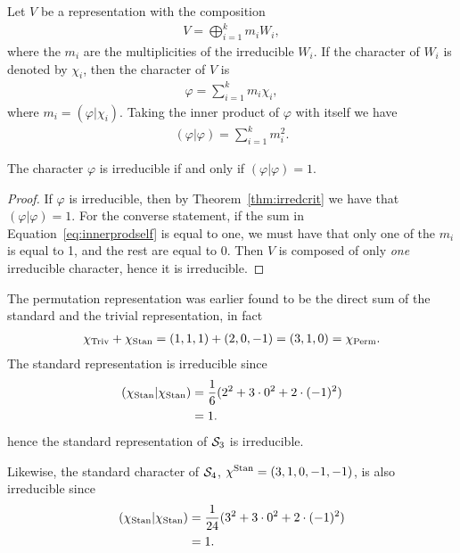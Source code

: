 \begin{note}
	Let $V$ be a representation with the composition 
	\begin{align*}
		V = \bigoplus_{i=1}^k m_i W_i, %
	\end{align*}
	where the $m_i$ are the multiplicities of the irreducible $W_i$. If the character of $W_i$ is denoted by $\chi_i$, then the character of $V$ is
	\begin{align*}
		\varphi = \sum_{i=1}^k m_i \chi_i,
	\end{align*}
	where $m_i = (\varphi|\chi_i)$.	Taking the inner product of $\varphi$ with itself we have
	\begin{align}\label{eq:innerprodself}
		(\varphi|\varphi) = \sum_{i=1}^k m_i^2.
	\end{align}
\end{note}

\begin{theorem}
	The character $\varphi$ is irreducible if and only if $(\varphi|\varphi) = 1$.
\end{theorem}
\begin{proof}
	If $\varphi$ is irreducible, then by Theorem~\ref{thm:irredcrit} we have that $(\varphi|\varphi) = 1$. For the converse statement, if the sum in Equation~\ref{eq:innerprodself} is equal to one, we must have that only one of the $m_i$ is equal to 1, and the rest are equal to 0. Then $V$ is composed of only \textit{one} irreducible character, hence it is irreducible.
\end{proof}

\begin{example}[$\Sym_3$]
	The permutation representation was earlier found to be the direct sum of the standard and the trivial representation, in fact
	\begin{align*}
		\chi_{\text{Triv}} + \chi_{\text{Stan}} = (1,1,1) + (2,0,-1) = (3,1,0) = \chi_{\text{Perm}}.
	\end{align*}
	The standard representation is irreducible since
	\begin{align*}
		(\chi_{\text{Stan}}\vert\chi_{\text{Stan}})  &= \frac{1}{6}(2^2 + 3\cdot 0^2 + 2 \cdot (-1)^2)  \\
		&= 1.
	\end{align*}
	hence the standard representation of $\Sym_3$ is irreducible. 
\end{example}

\begin{example}[$\Sym_4$]
	Likewise, the standard character of $\Sym_4$, $\chi^{\text{Stan}} = (3,1,0,-1,-1)$, is also irreducible since 
	\begin{align*}
		(\chi_{\text{Stan}} \vert \chi_{\text{Stan}}) &= \frac{1}{24}(3^2 + 3\cdot 0^2 + 2 \cdot (-1)^2)  \\
		&= 1.
	\end{align*}
\end{example}

